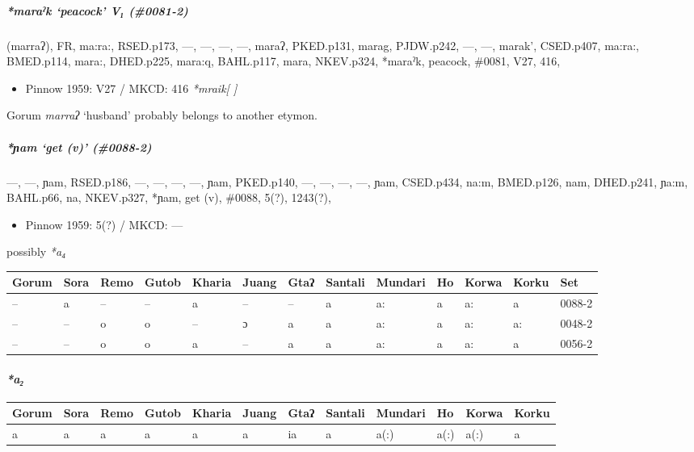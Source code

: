 \documentclass[a4paper,]{article}
\providecommand{\tightlist}{%
  \setlength{\itemsep}{0pt}\setlength{\parskip}{0pt}}
\let\oldparagraph\paragraph
\renewcommand{\paragraph}[1]{\oldparagraph{#1}\mbox{}}
\let\oldsubparagraph\subparagraph
\renewcommand{\subparagraph}[1]{\oldsubparagraph{#1}\mbox{}}
\begin{document}
\subparagraph{\texorpdfstring{\emph{*maraˀk} `peacock' V₁
(\#0081-2)}{*maraˀk peacock V₁ (\#0081-2)}}\label{maraux2c0k-peacock-v-0081-2}

(marraʔ), FR, ma:ra:, RSED.p173, ---, ---, ---, ---, maraʔ, PKED.p131,
marag, PJDW.p242, ---, ---, marak', CSED.p407, ma:ra:, BMED.p114, mara:,
DHED.p225, mara:q, BAHL.p117, mara, NKEV.p324, *maraˀk, peacock, \#0081,
V27, 416,

\begin{itemize}
\tightlist
\item
  Pinnow 1959: V27 / MKCD: 416 \emph{*mraik{[} {]}}
\end{itemize}

Gorum \emph{marraʔ} `husband' probably belongs to another etymon.

\subparagraph{\texorpdfstring{\emph{*ɲam} `get (v)'
(\#0088-2)}{*ɲam get (v) (\#0088-2)}}\label{ux272am-get-v-0088-2}

---, ---, ɲam, RSED.p186, ---, ---, ---, ---, ɲam, PKED.p140, ---, ---,
---, ---, ɲam, CSED.p434, na:m, BMED.p126, nam, DHED.p241, ɲa:m,
BAHL.p66, na, NKEV.p327, *ɲam, get (v), \#0088, 5(?), 1243(?),

\begin{itemize}
\tightlist
\item
  Pinnow 1959: 5(?) / MKCD: ---
\end{itemize}

possibly \emph{*a₄}

\begin{longtable}[]{@{}lllllllllllll@{}}
\toprule
Gorum & Sora & Remo & Gutob & Kharia & Juang & Gtaʔ & Santali & Mundari
& Ho & Korwa & Korku & Set\tabularnewline
\midrule
\endhead
-- & a & -- & -- & a & -- & -- & a & a: & a & a: & a &
0088-2\tabularnewline
-- & -- & o & o & -- & ɔ & a & a & a: & a & a: & a: &
0048-2\tabularnewline
-- & -- & o & o & a & -- & a & a & a: & a & a: & a &
0056-2\tabularnewline
\bottomrule
\end{longtable}

\paragraph{\texorpdfstring{\emph{*a₂}}{*a₂}}\label{a-1}

\begin{longtable}[]{@{}llllllllllll@{}}
\toprule
Gorum & Sora & Remo & Gutob & Kharia & Juang & Gtaʔ & Santali & Mundari
& Ho & Korwa & Korku\tabularnewline
\midrule
\endhead
a & a & a & a & a & a & ia & a & a(:) & a(:) & a(:) & a\tabularnewline
\bottomrule
\end{longtable}
\end{document}
